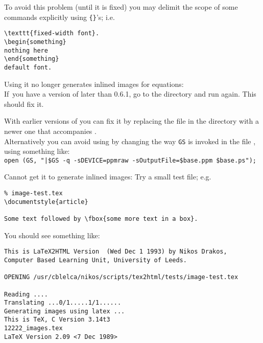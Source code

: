 \begin{htmllist}
To avoid this problem (until it is fixed) you may delimit the scope of
some commands explicitly using \verb|{}|'s; i.e.
\begin{small}
\begin{verbatim}
\texttt{fixed-width font}.
\begin{something}
nothing here
\end{something}
default font.
\end{verbatim}
\end{small}

\item [Using \appl{Ghostscript 3.x} it no
longer generates inlined images for equations:] \hfil\\
If~you have a version of \latextohtml{} later than 0.6.1, go to the
\latextohtml{} directory and run  again. 
This should fix it.

With earlier versions of \latextohtml{} you can fix it by 
replacing the file  in the 
\latextohtml{} directory with a newer one that accompanies 
.\\ 
Alternatively you can avoid using  
by changing the way \texttt{GS} is invoked in the file ,
using something like: \\
\verb/open (GS, "|$GS -q -sDEVICE=ppmraw -sOutputFile=$base.ppm $base.ps");/

\item [Cannot get it to generate inlined images: ]
Try a small test file; e.g.
\begin{small}
\begin{verbatim}
% image-test.tex
\documentstyle{article}

Some text followed by \fbox{some more text in a box}.

\end{verbatim}
\end{small}

You should see something like:
\begin{small}
\begin{verbatim}
This is LaTeX2HTML Version  (Wed Dec 1 1993) by Nikos Drakos, 
Computer Based Learning Unit, University of Leeds.

OPENING /usr/cblelca/nikos/scripts/tex2html/tests/image-test.tex 

Reading ....
Translating ...0/1.....1/1......
Generating images using latex ...
This is TeX, C Version 3.14t3
12222_images.tex
LaTeX Version 2.09 <7 Dec 1989>


\end{verbatim}
\end{small}
\end{htmllist}
